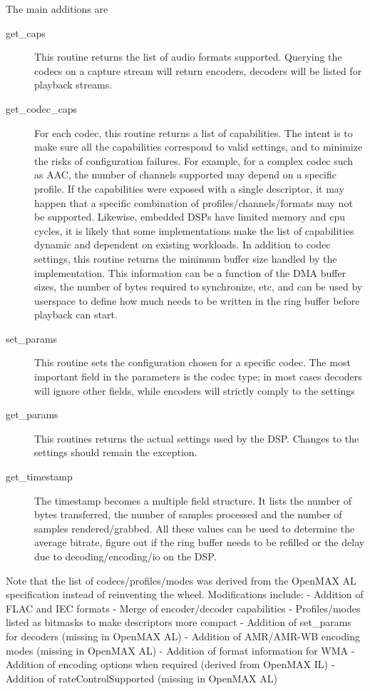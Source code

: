 \documentclass[a4paper,8pt,english]{sphinxmanual}
\begin{document}
The main additions are
\begin{description}
\item[{get\_caps}] \leavevmode
This routine returns the list of audio formats supported. Querying the
codecs on a capture stream will return encoders, decoders will be
listed for playback streams.

\item[{get\_codec\_caps}] \leavevmode
For each codec, this routine returns a list of
capabilities. The intent is to make sure all the capabilities
correspond to valid settings, and to minimize the risks of
configuration failures. For example, for a complex codec such as AAC,
the number of channels supported may depend on a specific profile. If
the capabilities were exposed with a single descriptor, it may happen
that a specific combination of profiles/channels/formats may not be
supported. Likewise, embedded DSPs have limited memory and cpu cycles,
it is likely that some implementations make the list of capabilities
dynamic and dependent on existing workloads. In addition to codec
settings, this routine returns the minimum buffer size handled by the
implementation. This information can be a function of the DMA buffer
sizes, the number of bytes required to synchronize, etc, and can be
used by userspace to define how much needs to be written in the ring
buffer before playback can start.

\item[{set\_params}] \leavevmode
This routine sets the configuration chosen for a specific codec. The
most important field in the parameters is the codec type; in most
cases decoders will ignore other fields, while encoders will strictly
comply to the settings

\item[{get\_params}] \leavevmode
This routines returns the actual settings used by the DSP. Changes to
the settings should remain the exception.

\item[{get\_timestamp}] \leavevmode
The timestamp becomes a multiple field structure. It lists the number
of bytes transferred, the number of samples processed and the number
of samples rendered/grabbed. All these values can be used to determine
the average bitrate, figure out if the ring buffer needs to be
refilled or the delay due to decoding/encoding/io on the DSP.

\end{description}

Note that the list of codecs/profiles/modes was derived from the
OpenMAX AL specification instead of reinventing the wheel.
Modifications include:
- Addition of FLAC and IEC formats
- Merge of encoder/decoder capabilities
- Profiles/modes listed as bitmasks to make descriptors more compact
- Addition of set\_params for decoders (missing in OpenMAX AL)
- Addition of AMR/AMR-WB encoding modes (missing in OpenMAX AL)
- Addition of format information for WMA
- Addition of encoding options when required (derived from OpenMAX IL)
- Addition of rateControlSupported (missing in OpenMAX AL)
\end{document}
